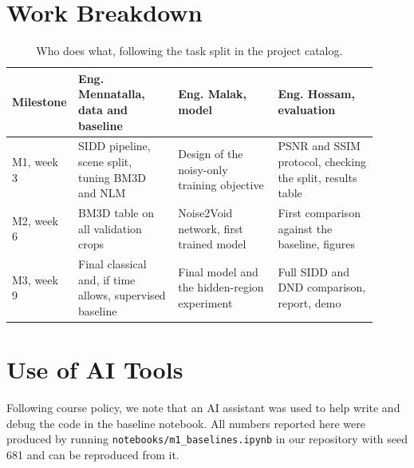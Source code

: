 \documentclass[11pt]{article}
\begin{document}
\section{Work Breakdown}
\label{sec:workbreakdown}
\begin{table}[ht]
\centering
\caption{Who does what, following the task split in the project catalog.}
\label{tab:tasks}
\begin{tabular}{@{}p{0.10\linewidth}p{0.27\linewidth}p{0.27\linewidth}p{0.27\linewidth}@{}}
\toprule
\textbf{Milestone} & \textbf{Eng. Mennatalla, data and baseline} & \textbf{Eng. Malak, model} & \textbf{Eng. Hossam, evaluation} \\
\midrule
M1, week 3 & SIDD pipeline, scene split, tuning BM3D and NLM & Design of the noisy-only training objective & PSNR and SSIM protocol, checking the split, results table \\
M2, week 6 & BM3D table on all validation crops & Noise2Void network, first trained model & First comparison against the baseline, figures \\
M3, week 9 & Final classical and, if time allows, supervised baseline & Final model and the hidden-region experiment & Full SIDD and DND comparison, report, demo \\
\bottomrule
\end{tabular}
\end{table}



\section*{Use of AI Tools}
Following course policy, we note that an AI assistant was used to help write and debug the
code in the baseline notebook. All numbers reported here were produced by running
\texttt{notebooks/m1\_baselines.ipynb} in our repository with seed 681 and can be
reproduced from it. 
\end{document}
